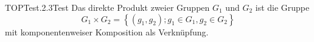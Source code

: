 \begin{DEF}{TOPTest.2.3}{Test}
Das direkte Produkt zweier Gruppen $G_1$ und $G_2$ ist die Gruppe
    $$
    G_1 \times G_2=\left\{\left(g_1, g_2\right) ; g_1 \in G_1, g_2 \in G_2\right\}
    $$
    mit komponentenweiser Komposition als Verknüpfung.
\end{DEF}
